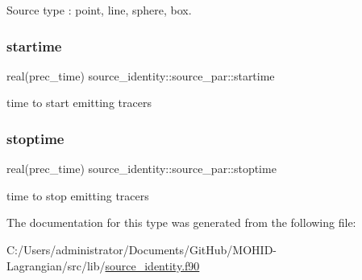 Source type \+: \textquotesingle{}point\textquotesingle{}, \textquotesingle{}line\textquotesingle{}, \textquotesingle{}sphere\textquotesingle{}, \textquotesingle{}box\textquotesingle{}. 

\mbox{\label{structsource__identity_1_1source__par_a11cd864db9e9021cec4bd018d6fec295}} 
\subsubsection{\texorpdfstring{startime}{startime}}
{\footnotesize\ttfamily real(prec\+\_\+time) source\+\_\+identity\+::source\+\_\+par\+::startime\hspace{0.3cm}{\ttfamily [private]}}



time to start emitting tracers 

\mbox{\label{structsource__identity_1_1source__par_a3ab5e22242b41bdcd56480b9d0496efa}} 
\subsubsection{\texorpdfstring{stoptime}{stoptime}}
{\footnotesize\ttfamily real(prec\+\_\+time) source\+\_\+identity\+::source\+\_\+par\+::stoptime\hspace{0.3cm}{\ttfamily [private]}}



time to stop emitting tracers 



The documentation for this type was generated from the following file\+:\begin{DoxyCompactItemize}
\item 
C\+:/\+Users/administrator/\+Documents/\+Git\+Hub/\+M\+O\+H\+I\+D-\/\+Lagrangian/src/lib/\hyperlink{source__identity_8f90}{source\+\_\+identity.\+f90}\end{DoxyCompactItemize}
